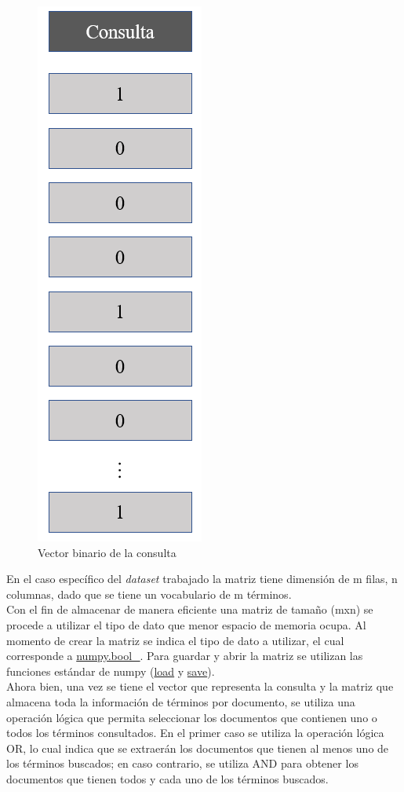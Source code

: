 \begin{figure}[]
    \centering
    \includegraphics[scale = 0.5]{doc/images/BS/b_query.PNG}
    \caption{Vector binario de la consulta}
    \label{fig:b_query}
\end{figure}

En el caso específico del \textit{dataset} trabajado la matriz tiene dimensión de m filas, n columnas, dado que se tiene un vocabulario de m términos.\\

Con el fin de almacenar de manera eficiente una matriz de tamaño (mxn) se procede a utilizar el tipo de dato que menor espacio de memoria ocupa. Al momento de crear la matriz se indica el tipo de dato a utilizar, el cual corresponde a \url{numpy.bool\_}. Para guardar y abrir la matriz se utilizan las funciones estándar de numpy (\url{load} y \url{save}).\\

Ahora bien, una vez se tiene el vector que representa la consulta y la matriz que almacena toda la información de términos por documento, se utiliza una operación lógica que permita seleccionar los documentos que contienen uno o todos los términos consultados. En el primer caso se utiliza la operación lógica OR, lo cual indica que se extraerán los documentos que tienen al menos uno de los términos buscados; en caso contrario, se utiliza AND para obtener los documentos que tienen todos y cada uno de los términos buscados.\\

